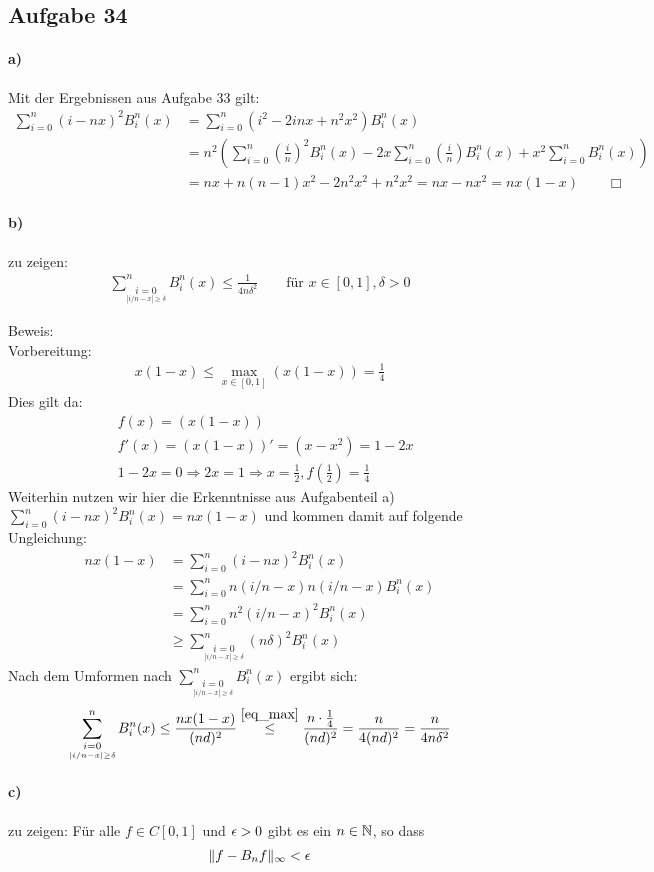 \subsection*{Aufgabe 34}

\paragraph*{a)}
Mit der Ergebnissen aus Aufgabe 33 gilt:
\begin{align*}
  \sum_{i = 0}^n (i - n x)^2 B_i^n(x) &= \sum_{i = 0}^n (i^2 - 2 i n x + n^2x^2) B_i^n(x) \\
  & = n^2 \left(\sum_{i = 0}^n \left(\frac{i}{n}\right)^2   B_i^n(x) -
    2 x \sum_{i = 0}^n \left(\frac{i}{n}\right) B_i^n(x) + x^2 \sum_{i = 0}^n B_i^n(x) \right) \\
  & =  n x + n(n-1) x^2 - 2 n^2 x^2 + n^2 x^2 = n x - n x^2 = n x (1 - x) \qquad \Box
\end{align*}

\paragraph*{b)}
zu zeigen:\begin{align*}
\sum_{\underset{|i/n-x|\ge \delta}{i=0}}^n B_i^n(x) \le \frac{1}{4n\delta^2} \qquad \text{für } x \in[0,1], \delta >0
\end{align*}

Beweis:\\\newline
Vorbereitung:
\begin{align}\label{eq_max}
x(1-x) \le \max_{x\in[0,1]}(x(1-x))=\frac{1}{4}
\end{align}
Dies gilt da: \begin{align*}
&f(x)=(x(1-x))\\
&f'(x)=(x(1-x))'=(x-x^2)=1-2x\\
&1-2x=0 \Rightarrow 2x=1 \Rightarrow x=\frac{1}{2}, f\left(\frac{1}{2}\right)=\frac{1}{4}
\end{align*}
Weiterhin nutzen wir hier die Erkenntnisse aus Aufgabenteil a)
$ \sum_{i = 0}^n (i - n x)^2 B_i^n(x)  = nx (1-x)$ und kommen damit auf folgende Ungleichung:
\begin{align}
nx (1-x) &=\sum_{i = 0}^n (i - n x)^2 B_i^n(x) \\&=\sum_{i = 0}^n n(i/n - x)n(i/n-x) B_i^n(x)\\&=\sum_{i = 0}^n n^2(i/n - x )^2 B_i^n(x) \\&\ge \sum_{\underset{|i/n-x|\ge \delta}{i=0}}^n (n\delta)^2 B_i^n(x)
\end{align}
Nach dem Umformen nach $\sum_{\underset{|i/n-x|\ge \delta}{i=0}}^n B_i^n(x)$ ergibt sich:
\begin{align}
\sum_{\underset{|i/n-x|\ge \delta}{i=0}}^n B_i^n(x) \le\frac{nx(1-x)}{(nd)^2}\overset{\eqref{eq_max}}{\le} \frac{n\cdot\frac{1}{4}}{(nd)^2}=\frac{n}{4(nd)^2}=\frac{n}{4n\delta^2}
\end{align}
\paragraph*{c)}
zu zeigen: Für alle $f \in C[0,1]$ und $\epsilon >0$ gibt es ein $n\in \mathbb N$, so dass\begin{align*}
\|f-B_nf\|_\infty < \epsilon
\end{align*}
